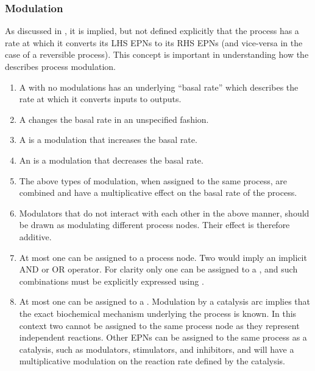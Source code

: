 \subsubsection{Modulation}
\label{sec:mod-semantics}

As discussed in , it is implied, but not defined explicitly that the process has a rate at
which it converts its LHS EPNs to its RHS EPNs (and vice-versa in the case of a reversible process). This concept is
important in understanding how the \PDl describes process modulation.

\begin{enumerate}
\item A  with no modulations has an underlying ``basal rate''
  which describes the rate at which it converts inputs to outputs.
\item A  changes the basal rate in an unspecified fashion.
\item A  is a modulation that increases the basal rate.
\item An  is a modulation that decreases the basal rate.
\item The above types of modulation, when assigned to the same process, are combined and have a multiplicative effect on the basal rate of the process.
\item Modulators that do not interact with each other in the above manner, should be drawn as modulating different process nodes. Their effect is therefore additive.
\item At most one  can be assigned to a process node. Two 
  would imply an implicit AND or OR operator. For clarity only
  one  can be assigned to a , and such combinations must be
  explicitly expressed using . 
\item At most one  can be assigned to a
  . Modulation by a catalysis arc implies that the exact biochemical mechanism underlying
  the process is known. In this context two  cannot
  be assigned to the same process node as they represent
  independent reactions. Other EPNs can be assigned to the same process as a catalysis, such as modulators, stimulators, and
  inhibitors, and will have a multiplicative modulation on the reaction rate defined by the catalysis.
\end{enumerate}

